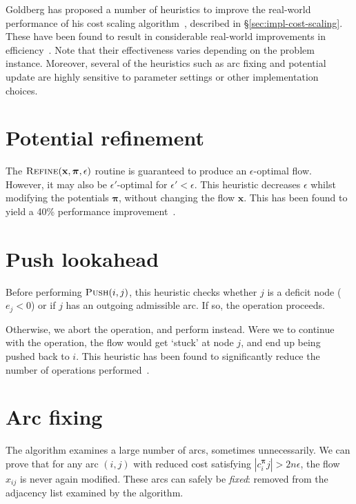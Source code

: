 Goldberg has proposed a number of heuristics to improve the real-world performance of his cost scaling algorithm~\cite{Goldberg:1997}, described in \S\ref{sec:impl-cost-scaling}. These have been found to result in considerable real-world improvements in efficiency~\cite{Bunnagel:1998,KiralyKovacs:2012}. Note that their effectiveness varies depending on the problem instance. Moreover, several of the heuristics such as arc fixing and potential update are highly sensitive to parameter settings or other implementation choices.

\section{Potential refinement} \label{appendix:csheuristics-potential-refinement}
The $\textproc{Refine}(\mathbf{x},\boldsymbol{\pi},\epsilon)$ routine is guaranteed to produce an $\epsilon$-optimal flow. However, it may also be $\epsilon'$-optimal for $\epsilon' < \epsilon$. This heuristic decreases $\epsilon$ whilst modifying the potentials $\boldsymbol{\pi}$, without changing the flow $\mathbf{x}$. This has been found to yield a 40\% performance improvement~\cite{Bunnagel:1998}.

\section{Push lookahead}
Before performing $\textproc{Push}(i,j)$, this heuristic checks whether $j$ is a deficit node ($e_j < 0$) or if $j$ has an outgoing admissible arc. If so, the  operation proceeds.

Otherwise, we abort the  operation, and perform  instead. Were we to continue with the  operation, the flow would get `stuck' at node $j$, and end up being pushed back to $i$. This heuristic has been found to significantly reduce the number of  operations performed~\cite{Goldberg:1997}.

\section{Arc fixing}
The algorithm examines a large number of arcs, sometimes unnecessarily. We can prove that for any arc $(i,j)$ with reduced cost satisfying $\left|c^{\boldsymbol{\pi}}_ij\right| > 2n\epsilon$, the flow $x_{ij}$ is never again modified. These arcs can safely be \emph{fixed}: removed from the adjacency list examined by the algorithm. 

